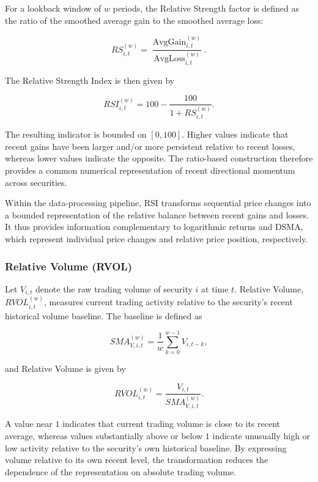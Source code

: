 For a lookback window of $w$ periods, the Relative Strength factor is defined as the ratio of the smoothed average gain to the smoothed average loss:

\begin{equation}
    RS_{i,t}^{(w)}
    =
    \frac{\operatorname{AvgGain}_{i,t}^{(w)}}
    {\operatorname{AvgLoss}_{i,t}^{(w)}}.
\end{equation}

The Relative Strength Index is then given by

\begin{equation}
    RSI_{i,t}^{(w)}
    =
    100-\frac{100}{1+RS_{i,t}^{(w)}}.
\end{equation}

The resulting indicator is bounded on $[0,100]$. Higher values indicate that recent gains have been larger and/or more persistent relative to recent losses, whereas lower values indicate the opposite. The ratio-based construction therefore provides a common numerical representation of recent directional momentum across securities.

\medskip

Within the data-processing pipeline, RSI transforms sequential price changes into a bounded representation of the relative balance between recent gains and losses. It thus provides information complementary to logarithmic returns and DSMA, which represent individual price changes and relative price position, respectively.

\subsubsection{Relative Volume (RVOL)}
Let $V_{i,t}$ denote the raw trading volume of security $i$ at time $t$. Relative Volume, $RVOL_{i,t}^{(w)}$, measures current trading activity relative to the security's recent historical volume baseline. The baseline is defined as

\begin{equation}
    SMA_{V,i,t}^{(w)}
    =
    \frac{1}{w}
    \sum_{k=0}^{w-1}V_{i,t-k},
\end{equation}

and Relative Volume is given by

\begin{equation}
    RVOL_{i,t}^{(w)}
    =
    \frac{V_{i,t}}
    {SMA_{V,i,t}^{(w)}}.
\end{equation}

A value near $1$ indicates that current trading volume is close to its recent average, whereas values substantially above or below $1$ indicate unusually high or low activity relative to the security's own historical baseline. By expressing volume relative to its own recent level, the transformation reduces the dependence of the representation on absolute trading volume.

